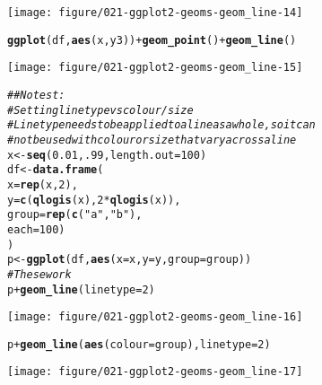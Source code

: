 \documentclass[a4paper,titlepage]{tufte-handout}\usepackage[]{graphicx}\usepackage[]{color}
\makeatletter
\def\maxwidth{ %
  \ifdim\Gin@nat@width>\linewidth
    \linewidth
  \else
    \Gin@nat@width
  \fi
}
\newcommand{\hlnum}[1]{\textcolor[rgb]{0.686,0.059,0.569}{#1}}%
\newcommand{\hlstr}[1]{\textcolor[rgb]{0.192,0.494,0.8}{#1}}%
\newcommand{\hlcom}[1]{\textcolor[rgb]{0.678,0.584,0.686}{\textit{#1}}}%
\newcommand{\hlopt}[1]{\textcolor[rgb]{0,0,0}{#1}}%
\newcommand{\hlstd}[1]{\textcolor[rgb]{0.345,0.345,0.345}{#1}}%
\newcommand{\hlkwb}[1]{\textcolor[rgb]{0.69,0.353,0.396}{#1}}%
\newcommand{\hlkwc}[1]{\textcolor[rgb]{0.333,0.667,0.333}{#1}}%
\newcommand{\hlkwd}[1]{\textcolor[rgb]{0.737,0.353,0.396}{\textbf{#1}}}%
\newenvironment{kframe}{%
 \def\at@end@of@kframe{}%
 \ifinner\ifhmode%
  \def\at@end@of@kframe{\end{minipage}}%
  \begin{minipage}{\columnwidth}%
 \fi\fi%
 \def\FrameCommand##1{\hskip\@totalleftmargin \hskip-\fboxsep
 \colorbox{shadecolor}{##1}\hskip-\fboxsep
     \hskip-\linewidth \hskip-\@totalleftmargin \hskip\columnwidth}%
 \MakeFramed {\advance\hsize-\width
   \@totalleftmargin\z@ \linewidth\hsize
   \@setminipage}}%
 {\par\unskip\endMakeFramed%
 \at@end@of@kframe}
\newenvironment{knitrout}{}{} %
\makeatother
\begin{document}
\begin{knitrout}
\begin{kframe}
{\ttfamily\noindent\color{warningcolor}{\#\# Warning: Removed 1 rows containing missing values (geom\_point).}}

{\ttfamily\noindent\color{warningcolor}{\#\# Warning: Removed 1 rows containing missing values (geom\_path).}}\end{kframe}
\texttt{[image: figure/021-ggplot2-geoms-geom\_line-14]} 
\begin{kframe}\begin{alltt}
\hlkwd{ggplot}\hlstd{(df,} \hlkwd{aes}\hlstd{(x, y3))} \hlopt{+} \hlkwd{geom_point}\hlstd{()} \hlopt{+} \hlkwd{geom_line}\hlstd{()}
\end{alltt}


{\ttfamily\noindent\color{warningcolor}{\#\# Warning: Removed 1 rows containing missing values (geom\_point).}}\end{kframe}
\texttt{[image: figure/021-ggplot2-geoms-geom\_line-15]} 
\begin{kframe}\begin{alltt}
\hlcom{## No test: }
\hlcom{# Setting line type vs colour/size}
\hlcom{# Line type needs to be applied to a line as a whole, so it can}
\hlcom{# not be used with colour or size that vary across a line}
\hlstd{x} \hlkwb{<-} \hlkwd{seq}\hlstd{(}\hlnum{0.01}\hlstd{,} \hlnum{.99}\hlstd{,} \hlkwc{length.out} \hlstd{=} \hlnum{100}\hlstd{)}
\hlstd{df} \hlkwb{<-} \hlkwd{data.frame}\hlstd{(}
  \hlkwc{x} \hlstd{=} \hlkwd{rep}\hlstd{(x,} \hlnum{2}\hlstd{),}
  \hlkwc{y} \hlstd{=} \hlkwd{c}\hlstd{(}\hlkwd{qlogis}\hlstd{(x),} \hlnum{2} \hlopt{*} \hlkwd{qlogis}\hlstd{(x)),}
  \hlkwc{group} \hlstd{=} \hlkwd{rep}\hlstd{(}\hlkwd{c}\hlstd{(}\hlstr{"a"}\hlstd{,}\hlstr{"b"}\hlstd{),}
  \hlkwc{each} \hlstd{=} \hlnum{100}\hlstd{)}
\hlstd{)}
\hlstd{p} \hlkwb{<-} \hlkwd{ggplot}\hlstd{(df,} \hlkwd{aes}\hlstd{(}\hlkwc{x}\hlstd{=x,} \hlkwc{y}\hlstd{=y,} \hlkwc{group}\hlstd{=group))}
\hlcom{# These work}
\hlstd{p} \hlopt{+} \hlkwd{geom_line}\hlstd{(}\hlkwc{linetype} \hlstd{=} \hlnum{2}\hlstd{)}
\end{alltt}
\end{kframe}
\texttt{[image: figure/021-ggplot2-geoms-geom\_line-16]} 
\begin{kframe}\begin{alltt}
\hlstd{p} \hlopt{+} \hlkwd{geom_line}\hlstd{(}\hlkwd{aes}\hlstd{(}\hlkwc{colour} \hlstd{= group),} \hlkwc{linetype} \hlstd{=} \hlnum{2}\hlstd{)}
\end{alltt}
\end{kframe}
\texttt{[image: figure/021-ggplot2-geoms-geom\_line-17]} 

\end{knitrout}
\end{document}
